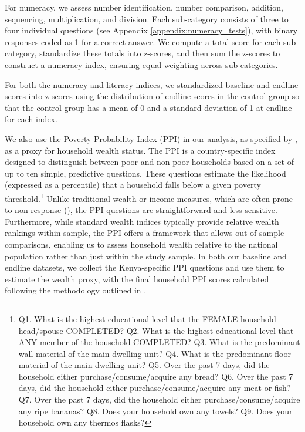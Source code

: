 \documentclass[hidelinks,12pt]{article}
\begin{document}
\begin{singlespace}
For numeracy, we assess number identification, number comparison, addition, sequencing, multiplication, and division. Each sub-category consists of three to four individual questions (see Appendix \ref{appendix:numeracy_tests}), with binary responses coded as 1 for a correct answer. We compute a total score for each sub-category, standardize these totals into z-scores, and then sum the z-scores to construct a numeracy index, ensuring equal weighting across sub-categories. 

For both the numeracy and literacy indices, we standardized baseline and endline scores into z-scores using the distribution of endline scores in the control group so that the control group has a mean of 0 and a standard deviation of 1 at endline for each index. 

We also use the Poverty Probability Index (PPI) in our analysis, as specified by \textcite{kshirsagar_household_2017}, as a proxy for household wealth status. The PPI is a country-specific index designed to distinguish between poor and non-poor households based on a set of up to ten simple, predictive questions. These questions estimate the likelihood (expressed as a percentile) that a household falls below a given poverty threshold.\footnote{Q1. What is the highest educational level that the FEMALE household head/spouse COMPLETED? Q2. What is the highest educational level that ANY member of the household COMPLETED? Q3. What is the predominant wall material of the main dwelling unit? Q4. What is the predominant floor material of the main dwelling unit? Q5. Over the past 7 days, did the household either purchase/consume/acquire any bread? Q6. Over the past 7 days, did the household either purchase/consume/acquire any meat or fish? Q7. Over the past 7 days, did the household either purchase/consume/acquire any ripe bananas? Q8. Does your household own any towels? Q9. Does your household own any thermos flasks?} Unlike traditional wealth or income measures, which are often prone to non-response (\cite{riphahn_item_2005}), the PPI questions are straightforward and less sensitive. Furthermore, while standard wealth indices typically provide relative wealth rankings within-sample, the PPI offers a framework that allows out-of-sample comparisons, enabling us to assess household wealth relative to the national population rather than just within the study sample. In both our baseline and endline datasets, we collect the Kenya-specific PPI questions and use them to estimate the wealth proxy, with the final household PPI scores calculated following the methodology outlined in \textcite{kshirsagar_household_2017}.


\end{singlespace}
\end{document}
